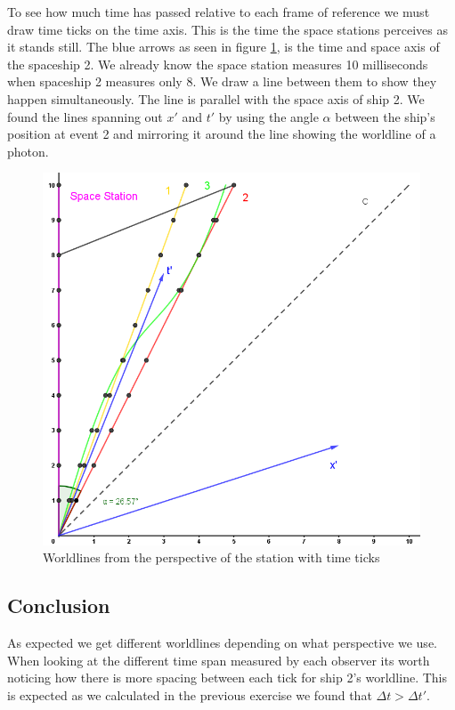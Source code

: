 \documentclass[reprint,english,notitlepage]{revtex4-2}
\begin{document}
  To see how much time has passed relative to each frame of reference we must draw time ticks on the time axis. This is the time the space stations perceives as it stands still. The blue arrows as seen in figure \ref{fig: Time Ticks}, is the time and space axis of the spaceship 2. We already know the space station measures 10 milliseconds when spaceship 2 measures only 8. We draw a line between them to show they happen simultaneously. The line is parallel with the space axis of ship 2. We found the lines spanning out $ x' $ and $ t' $ by using the angle $ α $ between the ship's position at event 2 and mirroring it around the line showing the worldline of a photon. 

  \begin{figure}[h!]
    \centering
    \includegraphics[scale = .5]{figures/4.10.png}
    \caption{Worldlines from the perspective of the station with time ticks}
    \label{fig: Time Ticks}
  \end{figure}
  
  \subsection{Conclusion} 
  
  As expected we get different worldlines depending on what perspective we use. When looking at the different time span measured by each observer its worth noticing how there is more spacing between each tick for ship 2's worldline. This is expected as we calculated in the previous exercise we found that $ Δt > Δt' $. 
\end{document}
